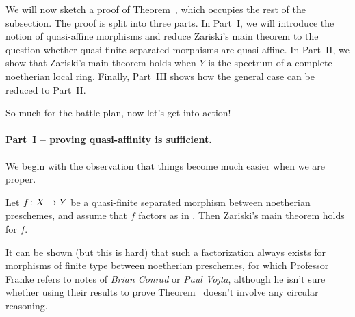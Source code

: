 \documentclass[a4paper,parskip=half,numbers=enddot, DIV=12]{scrreprt}
\begin{document}
	We will now sketch a proof of Theorem~, which occupies the rest of the subsection. The proof is split into three parts. In Part~I, we will introduce the notion of quasi-affine morphisms and reduce Zariski's main theorem to the question whether quasi-finite separated morphisms are quasi-affine. In Part~II, we show that Zariski's main theorem holds when $Y$ is the spectrum of a complete noetherian local ring. Finally, Part~III shows how the general case can be reduced to Part~II.
	
	So much for the battle plan, now let's get into action!
	
	\paragraph{Part~I -- proving quasi-affinity is sufficient.} We begin with the observation that things become much easier when we are proper.
	\begin{lem}
		Let $f\colon X\morphism Y$ be a quasi-finite separated morphism between noetherian preschemes, and assume that $f$ factors as in . Then Zariski's main theorem holds for $f$.
	\end{lem}
\begin{rem}
	 It can be shown (but this is hard) that such a factorization  always exists for morphisms of finite type between noetherian preschemes, for which Professor Franke refers to notes of \emph{Brian Conrad} or \emph{Paul Vojta}, although he isn't sure whether using their results to prove Theorem~ doesn't involve any circular reasoning.
\end{rem}
\end{document}
